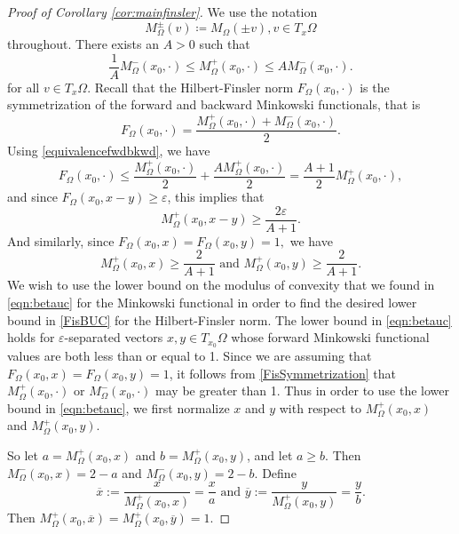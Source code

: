 \documentclass[10pt,a4paper]{amsart}
\begin{document}
\begin{proof}[Proof of Corollary \ref{cor:mainfinsler}]
We use the notation 
\begin{equation*}
     M_\Omega^{\pm}(v) \coloneq M_\Omega(\pm v),  v \in T_x\Omega
 \end{equation*}
 throughout.
 There exists an $A > 0$ such that
\begin{equation}\label{equivalencefwdbkwd}
   \frac{1}{A}M_\Omega^-(x_0,\cdot) \leq M_\Omega^+(x_0,\cdot) \leq AM_\Omega^-(x_0,\cdot).
 \end{equation}
 for all $v \in T_x\Omega$. Recall that the Hilbert-Finsler norm $F_\Omega(x_0, \cdot)$ is the symmetrization of the forward and backward Minkowski functionals, that is
 \begin{equation}\label{FisSymmetrization}
     F_\Omega(x_0,\cdot) = \frac{M^+_\Omega(x_0,\cdot) + M^-_\Omega(x_0,\cdot)}{2}.
 \end{equation}
 Using \ref{equivalencefwdbkwd}, we have
 \begin{equation}
  F_\Omega(x_0,\cdot) \leq \frac{M^+_\Omega(x_0,\cdot)}{2} +    \frac{AM^+_\Omega(x_0,\cdot)}{2} = \frac{A+1}{2}M^+_\Omega(x_0,\cdot),
 \end{equation}
and since $F_\Omega(x_0,x-y) \geq \varepsilon$, this implies that
 \begin{equation}\label{unnormalizedlower}
  M^+_\Omega(x_0,x-y) \geq \frac{2\varepsilon}{A+1}.   
 \end{equation}
 And similarly, since $F_\Omega(x_0,x)=F_\Omega(x_0,y)=1,$ we have
 \begin{equation}\label{lowerboundforForward}
   M^+_\Omega(x_0,x) \geq \frac{2}{A+1}  \text{ and } M^+_\Omega(x_0,y) \geq \frac{2}{A+1}.
 \end{equation}
We wish to use the lower bound on the modulus of convexity that we found in \ref{eqn:betauc} for the Minkowski functional in order to find the desired lower bound in \ref{FisBUC} for the Hilbert-Finsler norm. The lower bound in \ref{eqn:betauc} holds for $\varepsilon$-separated vectors $x,y \in T_{x_0}\Omega$ whose forward Minkowski functional values are both less than or equal to 1. Since we are assuming that $F_\Omega(x_0,x)=F_\Omega(x_0,y)=1$, it follows from \ref{FisSymmetrization} that $M^+_\Omega(x_0,\cdot)$ or $M^-_\Omega(x_0,\cdot)$ may be greater than 1. Thus in order to use the lower bound in \ref{eqn:betauc}, we first normalize $x$ and $y$ with respect to $M^+_\Omega(x_0,x)$ and $M^+_\Omega(x_0,y)$.

So let $a = M^+_\Omega(x_0,x)$ and $b = M^+_\Omega(x_0,y)$, and let $a \geq b$. Then $M^-_\Omega(x_0,x) = 2-a$ and $M^-_\Omega(x_0,y) = 2-b$. Define
\begin{equation}
    \overline{x} := \frac{x}{M^+_\Omega(x_0,x)}=\frac{x}{a} \text{ and } \overline{y} := \frac{y}{M^+_\Omega(x_0,y)}=\frac{y}{b}.
\end{equation}
Then $M^+_\Omega(x_0, \overline{x}) = M^+_\Omega(x_0, \overline{y}) = 1$.


\end{proof}
\end{document}
